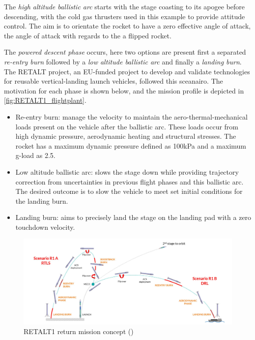 The \textit{high altitude ballistic arc} starts with the stage coasting to its apogee before descending, with the cold gas thrusters used in this example to provide attitude control. The aim is to orientate the rocket to have a zero effective angle of attack, the angle of attack with regards to the a flipped rocket.

The \textit{powered descent phase} occurs, here two options are present first a separated \textit{re-entry burn} followed by a \textit{low altitude ballistic arc} and finally a \textit{landing burn}. The RETALT project, an EU-funded project to develop and validate technologies for reusable vertical-landing launch vehicles, \cite{dezaiacomo2022retalt} followed this sceanairo. The motivation for each phase is shown below, and the mission profile is depicted in \autoref{fig:RETALT1_flightplant}.
\begin{itemize}
    \item Re-entry burn: manage the velocity to maintain the aero-thermal-mechanical loads present on the vehicle after the ballistic arc. These loads occur from high dynamic pressure, aerodynamic heating and structural stresses. The rocket has a maximum dynamic pressure defined as 100kPa and a maximum g-load as 2.5.
    \item Low altitude ballistic arc: slows the stage down while providing trajectory correction from uncertainties in previous flight phases and this ballistic arc. The desired outcome is to slow the vehicle to meet set initial conditions for the landing burn.
    \item Landing burn: aims to precisely land the stage on the landing pad with a zero touchdown velocity.
\end{itemize}

\begin{figure}[h!]
    \centering
    \includegraphics[width=0.95\linewidth]{Figures/RETALT1landing.png}
    \caption{RETALT1 return mission concept (\cite{dezaiacomo2022retalt})}
    \label{fig:RETALT1_flightplant}
\end{figure}

